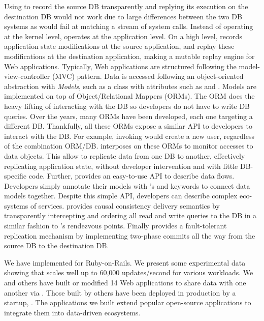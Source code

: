 Using \dora to record the source DB transparently and replying its execution on
the destination DB would not work due to large differences between the two DB systems
as \dora would fail at matching a stream of system calls.
Instead of operating at the kernel level, \synapse operates at the application level.
On a high level, \synapse records application state modifications at the source
application, and replay these modifications at the destination application,
making \synapse a mutable replay engine for Web applications.
Typically, Web applications are structured following
the model-view-controller (MVC) pattern. Data is accessed following an object-oriented
abstraction with {\em Models}, such as a  class with attributes such
as  and . Models are implemented on top of
Object/Relational Mappers (ORMs).
The ORM does the heavy lifting of interacting with the DB so developers
do not have to write DB queries. Over the years, many ORMs have been developed,
each one targeting a different DB. Thankfully, all these ORMs expose a similar API
to developers to interact with the DB. For example, invoking
 would create a new user, regardless of the combination
ORM/DB.  \synapse interposes on these ORMs to monitor accesses to data objects.
This allow \synapse to replicate data from
one DB to another, effectively replicating application state,
without developer intervention and with little DB-specific code.
Further, \synapse provides an easy-to-use API to describe data flows. Developers simply
annotate their models with \synapse's  and 
keywords to connect data models together.
Despite this simple API, developers can describe complex eco-systems
of services. \synapse provides causal consistency delivery semantics by
transparently intercepting and ordering all read and write queries to the DB in
a similar fashion to \scribe's rendezvous points. Finally \synapse provides
a fault-tolerant replication mechanism by implementing two-phase commits all
the way from the source DB to the destination DB.

We have implemented \synapse for Ruby-on-Rails. We present some experimental
data showing that \synapse scales well up to 60,000 updates/second for various
workloads.  We and others have built or modified 14 Web applications to share
data with one another via \synapse. Those built by others have been deployed in
production by a startup, \crowdtap.  The applications we built extend popular
open-source applications to integrate them into data-driven ecosystems.

